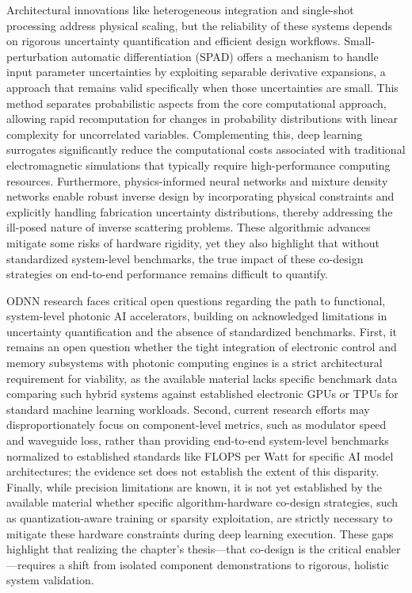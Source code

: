 Architectural innovations like heterogeneous integration and single-shot processing address physical scaling, but the reliability of these systems depends on rigorous uncertainty quantification and efficient design workflows. Small-perturbation automatic differentiation (SPAD) offers a mechanism to handle input parameter uncertainties by exploiting separable derivative expansions, a approach that remains valid specifically when those uncertainties are small. This method separates probabilistic aspects from the core computational approach, allowing rapid recomputation for changes in probability distributions with linear complexity for uncorrelated variables. Complementing this, deep learning surrogates significantly reduce the computational costs associated with traditional electromagnetic simulations that typically require high-performance computing resources. Furthermore, physics-informed neural networks and mixture density networks enable robust inverse design by incorporating physical constraints and explicitly handling fabrication uncertainty distributions, thereby addressing the ill-posed nature of inverse scattering problems. These algorithmic advances mitigate some risks of hardware rigidity, yet they also highlight that without standardized system-level benchmarks, the true impact of these co-design strategies on end-to-end performance remains difficult to quantify. \citep{s2_964fe0d656467421d5df282abd0e0a2aca877e7e_399e029e} \citep{doi_10_1109_sbfotoniopc62248_2024_10813471_692f0088} \citep{s2_037e66f37189104d61c0d000de0cee202b7eec9e_d15b8018}

ODNN research faces critical open questions regarding the path to functional, system-level photonic AI accelerators, building on acknowledged limitations in uncertainty quantification and the absence of standardized benchmarks. First, it remains an open question whether the tight integration of electronic control and memory subsystems with photonic computing engines is a strict architectural requirement for viability, as the available material lacks specific benchmark data comparing such hybrid systems against established electronic GPUs or TPUs for standard machine learning workloads. Second, current research efforts may disproportionately focus on component-level metrics, such as modulator speed and waveguide loss, rather than providing end-to-end system-level benchmarks normalized to established standards like FLOPS per Watt for specific AI model architectures; the evidence set does not establish the extent of this disparity. Finally, while precision limitations are known, it is not yet established by the available material whether specific algorithm-hardware co-design strategies, such as quantization-aware training or sparsity exploitation, are strictly necessary to mitigate these hardware constraints during deep learning execution. These gaps highlight that realizing the chapter's thesis---that co-design is the critical enabler---requires a shift from isolated component demonstrations to rigorous, holistic system validation.

